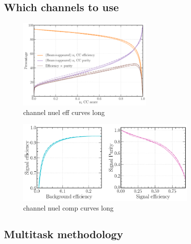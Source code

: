 \subsection{Which channels to use} %
\label{sec:cvn_baseline_channel} %

\begin{figure} %
    \includegraphics[width=0.6\textwidth]{diagrams/7-cvn/chipsnet/channel_nuel_eff_curves.pdf}
    \caption[channel nuel eff curves short]
    {channel nuel eff curves long}
    \label{fig:channel_nuel_eff_curves}
\end{figure}

\begin{figure} %
    \includegraphics[width=0.8\textwidth]{diagrams/7-cvn/chipsnet/channel_nuel_comp_curves.pdf}
    \caption[channel nuel comp curves short]
    {channel nuel comp curves long}
    \label{fig:channel_nuel_comp_curves}
\end{figure}

\subsection{Multitask methodology} %
\label{sec:cvn_baseline_multi} %

